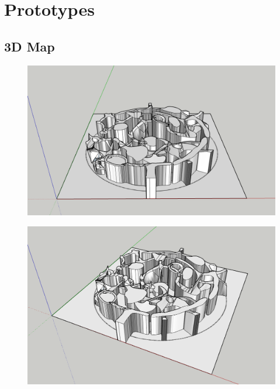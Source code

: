 \section{Prototypes}

\subsection{3D Map}

\begin{figure}[H]
	\centering
	\includegraphics[width=14cm]{images/map/3D_map_001.png}
\end{figure}
\vspace*{3cm}
\begin{figure}[H]
	\centering
	\includegraphics[width=14cm]{images/map/3D_map_002.png}
\end{figure}

